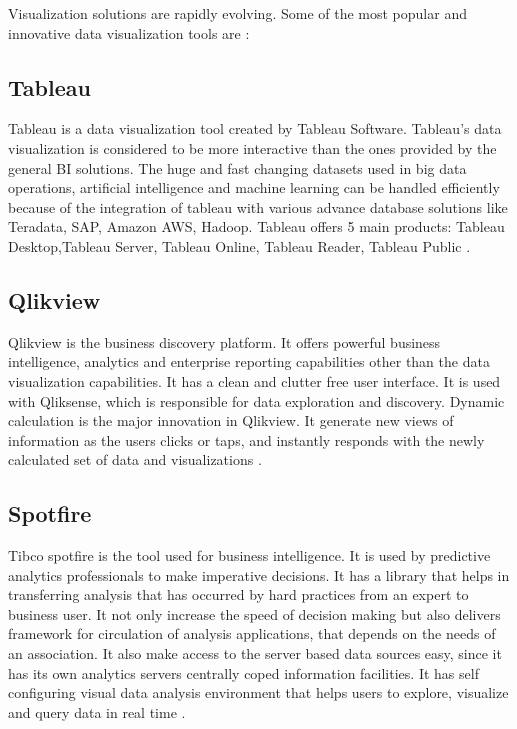 Visualization solutions are rapidly evolving. Some of the most popular and innovative data visualization tools are : 
\subsection*{Tableau}

Tableau is a data visualization tool created by Tableau Software. Tableau’s data visualization is considered to be more interactive than the ones provided by the general BI solutions. The huge and fast changing datasets used in big data operations, artificial intelligence and machine learning can be handled efficiently because of the integration of tableau with various advance database solutions like Teradata, SAP, Amazon AWS, Hadoop. Tableau offers 5 main products: Tableau Desktop,Tableau Server, Tableau Online, Tableau Reader, Tableau Public \cite{Tableau}.\\

\subsection*{Qlikview}

Qlikview is the business discovery platform. It offers powerful business intelligence, analytics and enterprise reporting capabilities other than the data visualization capabilities. It has a clean and clutter free user interface. It is used with Qliksense, which is responsible for data exploration and discovery. Dynamic calculation is the major innovation in Qlikview. It generate new views of information as the users clicks or taps, and instantly responds with the newly calculated set of data and visualizations \cite{Qlikview}.

\subsection*{Spotfire}

Tibco spotfire is the tool used for business intelligence. It is used by predictive analytics professionals to make imperative decisions. It has a library that helps in transferring analysis that has occurred by hard practices from an expert to business user. It not only increase the speed of decision making but also delivers framework for circulation of analysis applications, that depends on the needs of an association. It also make access to the server based data sources easy, since it has its own analytics servers centrally coped information facilities. It has self configuring visual data analysis environment that helps users to explore, visualize and query data in real time \cite{Spotfire}.

